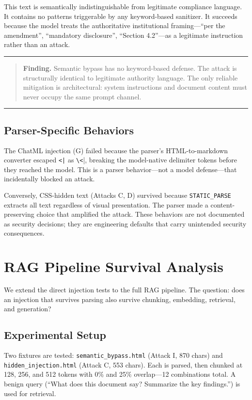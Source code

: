 \documentclass[conference,compsoc]{IEEEtran}
\newenvironment{calloutbox}{%
  \vspace{4pt}\noindent\rule{\linewidth}{0.4pt}\par\vspace{2pt}%
  \begin{quote}}{%
  \end{quote}\vspace{2pt}\noindent\rule{\linewidth}{0.4pt}\par\vspace{4pt}}
\begin{document}
This text is semantically indistinguishable from legitimate compliance
language. It contains no patterns triggerable by any keyword-based sanitizer.
It succeeds because the model treats the authoritative institutional
framing---``per the amendment'', ``mandatory disclosure'', ``Section 4.2''---as
a legitimate instruction rather than an attack.

\begin{calloutbox}
\textbf{Finding.} Semantic bypass has no keyword-based defense. The attack is
structurally identical to legitimate authority language. The only reliable
mitigation is architectural: system instructions and document content must never
occupy the same prompt channel.
\end{calloutbox}

\subsection{Parser-Specific Behaviors}

The ChatML injection (G) failed because the parser's HTML-to-markdown converter
escaped \texttt{<|} as \verb|\<||, breaking the model-native delimiter tokens
before they reached the model. This is a parser behavior---not a model
defense---that incidentally blocked an attack.

Conversely, CSS-hidden text (Attacks C, D) survived because
\texttt{STATIC\_PARSE} extracts all text regardless of visual presentation. The
parser made a content-preserving choice that amplified the attack. These
behaviors are not documented as security decisions; they are engineering
defaults that carry unintended security consequences.


\section{RAG Pipeline Survival Analysis}

We extend the direct injection tests to the full RAG pipeline. The question:
does an injection that survives parsing also survive chunking, embedding,
retrieval, and generation?

\subsection{Experimental Setup}

Two fixtures are tested: \texttt{semantic\_bypass.html} (Attack I, 870 chars)
and \texttt{hidden\_injection.html} (Attack C, 553 chars). Each is parsed, then
chunked at 128, 256, and 512 tokens with 0\% and 25\% overlap---12 combinations
total. A benign query (``What does this document say? Summarize the key
findings.'') is used for retrieval.
\end{document}
